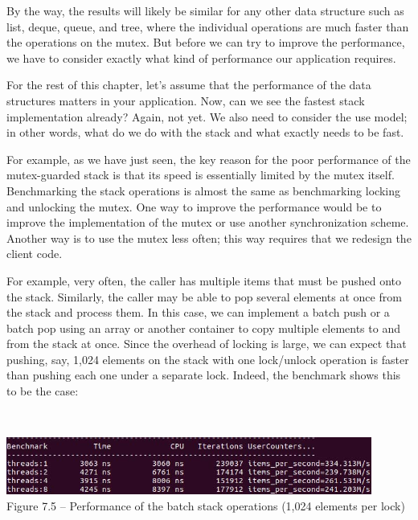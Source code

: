 By the way, the results will likely be similar for any other data structure such as list, deque, queue, and tree, where the individual operations are much faster than the operations on the mutex. But before we can try to improve the performance, we have to consider exactly what kind of performance our application requires.


For the rest of this chapter, let's assume that the performance of the data structures matters in your application. Now, can we see the fastest stack implementation already? Again, not yet. We also need to consider the use model; in other words, what do we do with the stack and what exactly needs to be fast.

For example, as we have just seen, the key reason for the poor performance of the mutex-guarded stack is that its speed is essentially limited by the mutex itself. Benchmarking the stack operations is almost the same as benchmarking locking and unlocking the mutex. One way to improve the performance would be to improve the implementation of the mutex or use another synchronization scheme. Another way is to use the mutex less often; this way requires that we redesign the client code.

For example, very often, the caller has multiple items that must be pushed onto the stack. Similarly, the caller may be able to pop several elements at once from the stack and process them. In this case, we can implement a batch push or a batch pop using an array or another container to copy multiple elements to and from the stack at once. Since the overhead of locking is large, we can expect that pushing, say, 1,024 elements on the stack with one lock/unlock operation is faster than pushing each one under a separate lock. Indeed, the benchmark shows this to be the case:

\hspace*{\fill} \\ %
\begin{center}
\includegraphics[width=0.9\textwidth]{content/2/chapter7/images/5.jpg}\\
Figure 7.5 – Performance of the batch stack operations (1,024 elements per lock)
\end{center}

